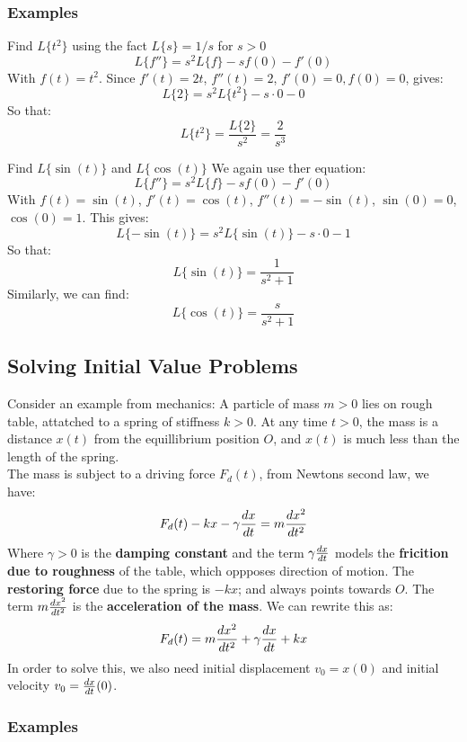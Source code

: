 \documentclass[a4paper, 10pt]{article}
\begin{document}
\subsubsection{Examples}

\begin{examplebox}{Find $L\{t^2\}$ using the fact $L\{s\} = 1/s$ for $s > 0$}{}
  $$L\{f''\} = s^2 L\{f\} - sf(0) - f'(0)$$
  With $f(t) = t^2$.
  Since $f'(t) = 2t$, $f''(t) = 2$, $f'(0) = 0, f(0) = 0$, gives:
  $$L\{2\} = s^2 L\{t^2\} - s \cdot 0 - 0$$
  So that:
  $$L\{t^2\} = \frac{L\{2\}}{s^2} = \frac{2}{s^3}$$
\end{examplebox}

\begin{examplebox}{Find $L\{\sin(t)\}$ and $L\{\cos(t)\}$}{}
  We again use ther equation:
  $$L\{f''\} = s^2 L\{f\} - sf(0) - f'(0)$$
  With $f(t) = \sin(t)$, $f'(t) = \cos(t)$, $f''(t) = -\sin(t)$, $\sin(0) = 0$, $\cos(0) = 1$. This gives:
  $$L\{-\sin(t)\} = s^2 L\{\sin(t)\} - s \cdot 0 - 1$$
  So that:
  $$L\{\sin(t)\} = \frac{1}{s^2 + 1}$$
  Similarly, we can find:
  $$L\{\cos(t)\} = \frac{s}{s^2 + 1}$$
\end{examplebox}
\pagebreak

\subsection{Solving Initial Value Problems}
Consider an example from mechanics: A particle of mass $m > 0$ lies on rough table, attatched to a spring of stiffness $k > 0$. At any time $t > 0$, the mass is a distance $x(t)$ from the equillibrium position $O$, and $x(t)$ is much less than the length of the spring. \\
The mass is subject to a driving force $F_d(t)$, from Newtons second law, we have:
$$F_d(t) - kx - \gamma \frac{dx}{dt} = m \frac{dx^2}{dt^2}$$
Where $\gamma > 0$ is the \textbf{damping constant} and the term $\gamma \frac{dx}{dt}$ models the \textbf{fricition due to roughness} of the table, which oppposes direction of motion. The \textbf{restoring force} due to the spring is $-kx$; and always points towards $O$. The term $m \frac{dx^2}{dt^2}$ is the \textbf{acceleration of the mass}. We can rewrite this as:
$$F_d(t) = m \frac{dx^2}{dt^2} + \gamma \frac{dx}{dt} + kx$$
In order to solve this, we also need initial displacement $v_0 = x(0)$ and initial velocity $v_0 = \frac{dx}{dt}(0)$.

\subsubsection{Examples}
\end{document}
